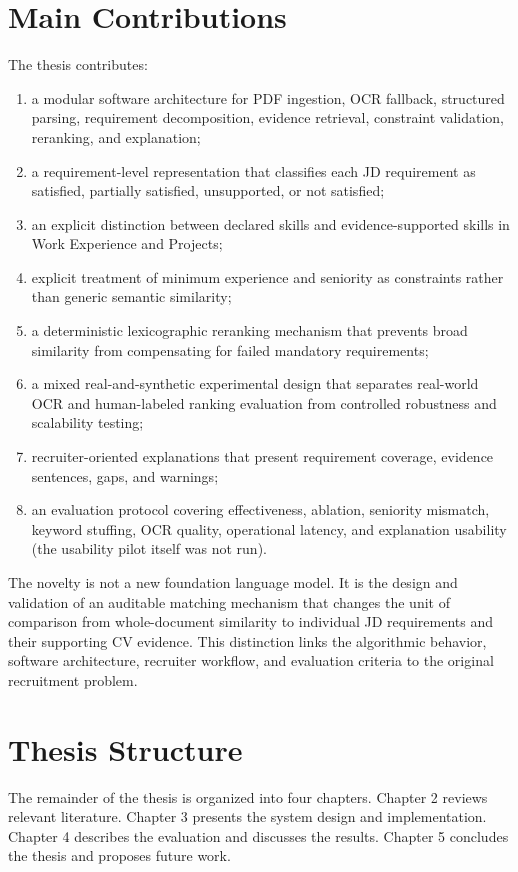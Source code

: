 \documentclass[12pt,a4paper,oneside]{report}
\begin{document}
\section{Main Contributions}
The thesis contributes:
\begin{enumerate}
  \item a modular software architecture for PDF ingestion, OCR fallback, structured parsing, requirement decomposition, evidence retrieval, constraint validation, reranking, and explanation;
  \item a requirement-level representation that classifies each JD requirement as satisfied, partially satisfied, unsupported, or not satisfied;
  \item an explicit distinction between declared skills and evidence-supported skills in Work Experience and Projects;
  \item explicit treatment of minimum experience and seniority as constraints rather than generic semantic similarity;
  \item a deterministic lexicographic reranking mechanism that prevents broad similarity from compensating for failed mandatory requirements;
  \item a mixed real-and-synthetic experimental design that separates real-world OCR and human-labeled ranking evaluation from controlled robustness and scalability testing;
  \item recruiter-oriented explanations that present requirement coverage, evidence sentences, gaps, and warnings;
  \item an evaluation protocol covering effectiveness, ablation, seniority mismatch, keyword stuffing, OCR quality, operational latency, and explanation usability (the usability pilot itself was not run).
\end{enumerate}

The novelty is not a new foundation language model. It is the design and validation of an auditable matching mechanism that changes the unit of comparison from whole-document similarity to individual JD requirements and their supporting CV evidence. This distinction links the algorithmic behavior, software architecture, recruiter workflow, and evaluation criteria to the original recruitment problem.

\section{Thesis Structure}
The remainder of the thesis is organized into four chapters. Chapter 2 reviews relevant literature. Chapter 3 presents the system design and implementation. Chapter 4 describes the evaluation and discusses the results. Chapter 5 concludes the thesis and proposes future work.
\end{document}
